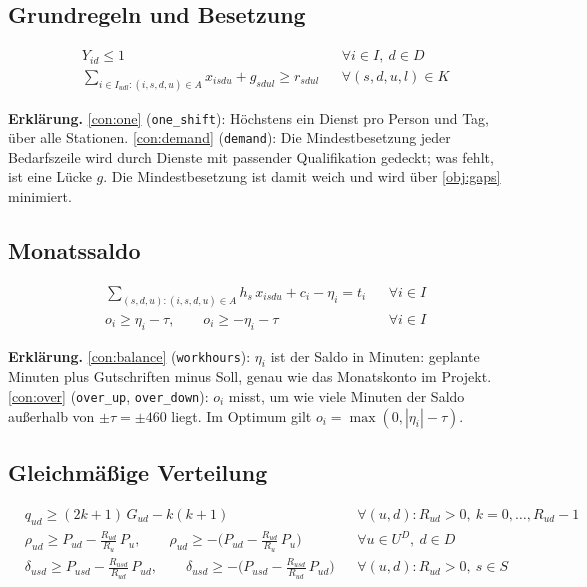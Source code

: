 \documentclass[11pt]{combiArticle}
\newcommand{\code}[1]{\texttt{#1}}
\begin{document}
\subsection{Grundregeln und Besetzung}

\begin{align}
  & Y_{id} \le 1 && \forall i \in I,\ d \in D \label{con:one}\\
  & \textstyle\sum_{i \in I_{udl} : (i,s,d,u) \in A} x_{isdu} + g_{sdul} \ge r_{sdul} && \forall (s,d,u,l) \in K \label{con:demand}
\end{align}

\textbf{Erklärung.}
\eqref{con:one} (\code{one\_shift}): Höchstens ein Dienst pro Person und Tag, über alle Stationen.
\eqref{con:demand} (\code{demand}): Die Mindestbesetzung jeder Bedarfszeile wird durch Dienste mit passender
Qualifikation gedeckt; was fehlt, ist eine Lücke $g$. Die Mindestbesetzung ist damit weich und wird über
\eqref{obj:gaps} minimiert.

\subsection{Monatssaldo}

\begin{align}
  & \textstyle\sum_{(s,d,u) : (i,s,d,u) \in A} h_s\, x_{isdu} + c_i - \eta_i = t_i && \forall i \in I \label{con:balance}\\
  & o_i \ge \eta_i - \tau,\qquad o_i \ge -\eta_i - \tau && \forall i \in I \label{con:over}
\end{align}

\textbf{Erklärung.}
\eqref{con:balance} (\code{workhours}): $\eta_i$ ist der Saldo in Minuten: geplante Minuten plus
Gutschriften minus Soll, genau wie das Monatskonto im Projekt.
\eqref{con:over} (\code{over\_up}, \code{over\_down}): $o_i$ misst, um wie viele Minuten der Saldo außerhalb
von $\pm\tau = \pm 460$ liegt. Im Optimum gilt $o_i = \max(0, |\eta_i| - \tau)$.

\subsection{Gleichmäßige Verteilung}

\begin{align}
  & q_{ud} \ge (2k+1)\, G_{ud} - k(k+1) && \forall (u,d) : R_{ud} > 0,\ k = 0,\dots,R_{ud}-1 \label{con:gapsq}\\
  & \rho_{ud} \ge P_{ud} - \tfrac{R_{ud}}{R_u}\, P_u,\qquad
    \rho_{ud} \ge -\bigl(P_{ud} - \tfrac{R_{ud}}{R_u}\, P_u\bigr) && \forall u \in U^{D},\ d \in D \label{con:daydev}\\
  & \delta_{usd} \ge P_{usd} - \tfrac{R_{usd}}{R_{ud}}\, P_{ud},\qquad
    \delta_{usd} \ge -\bigl(P_{usd} - \tfrac{R_{usd}}{R_{ud}}\, P_{ud}\bigr) && \forall (u,d) : R_{ud} > 0,\ s \in S \label{con:shiftdev}
\end{align}
\end{document}
